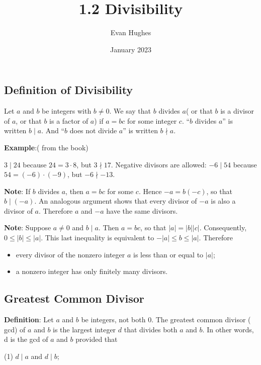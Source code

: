 \documentclass{article}
\title{1.2 Divisibility}
\author{Evan Hughes}
\date{January 2023}
\begin{document}
\maketitle
\subsection*{Definition of Divisibility}

Let $a$ and $b$ be integers with $b \neq 0$. 
We say that $b$ divides $a$( or that $b$ is a divisor of $a$, or that $b$ is a factor of $a$) if $a=bc$ for some integer $c$. ``$b$ divides $a$'' is written $b \mid a$.
And ``$b$ does not divide $a$'' is written $b \nmid a$.


\vspace*{5mm}
\textbf{Example}:( from the book) 

$3 \mid 24$ because $24=3\cdot8$, 
but $3 \nmid 17$. Negative divisors are allowed: 
$-6 \mid 54$ because $54=( -6) \cdot( -9) $, 
but $-6 \nmid -13$.
\vspace*{5mm}

\textbf{Note}: If $b$ divides $a$, then $a = bc$ for some $c$. Hence $-a= b(-c)$, so that
$b \mid (-a)$. An analogous argument shows that every divisor of $-a$ is also a divisor of $a$.
Therefore $a$ and $-a$ have the same divisors. 

\textbf{Note}: Suppose $a \neq 0$ and $b \mid a$. Then $a=bc$, so that 
$\left\lvert a\right\rvert=\left\lvert b\right\rvert \left\lvert c\right\rvert$. 
Consequently, $0 \leq \left\lvert b\right\rvert \leq \left\lvert a\right\rvert $. 
This last inequality is equivalent to $-\left\lvert a\right\rvert \leq b \leq \left\lvert a\right\rvert$.
Therefore 
\begin{itemize}
    \item every divisor of the nonzero integer $a$ is less than or equal to $\left\lvert a\right\rvert$;
    \item a nonzero integer has only finitely many divisors. 
\end{itemize}

\subsection*{Greatest Common Divisor}
\textbf{Definition}:
Let $a$ and $b$ be integers, not both $0$. The greatest common divisor ( gcd) of
$a$ and $b$ is the largest integer $d$ that divides both $a$ and $b$. In other words,
d is the gcd of $a$ and $b$ provided that

(1) $d\mid a$ and $d\mid b$;
\end{document}
